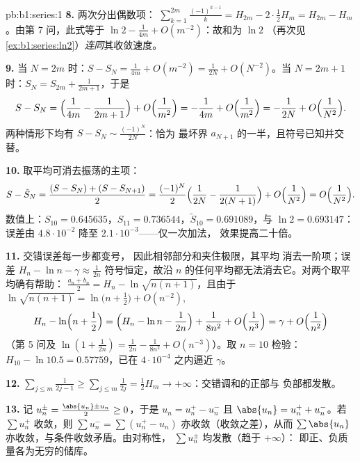 \begin{solution}{pb:b1:series:1}
\textbf{8.} 两次分出偶数项：
$\sum_{k=1}^{2m}\frac{(-1)^{k-1}}{k} = H_{2m} - 2\cdot\frac12
H_m = H_{2m} - H_m$。由第 7 问，此式等于 $\ln 2 -
\frac{1}{4m} + O(m^{-2})$：故和为 $\ln 2$
（再次见\cref{ex:b1:series:ln2}）\emph{连同}其收敛速度。

\textbf{9.} 当 $N = 2m$ 时：$S - S_N = \frac{1}{4m} + O(m^{-2}) =
\frac{1}{2N} + O(N^{-2})$。当 $N = 2m + 1$ 时：$S_{N} = S_{2m} +
\frac{1}{2m+1}$，于是
\[
S - S_N = \Bigl(\frac{1}{4m} - \frac{1}{2m+1}\Bigr) +
O\Bigl(\frac{1}{m^2}\Bigr)
= -\frac{1}{4m} + O\Bigl(\frac{1}{m^2}\Bigr)
= -\frac{1}{2N} + O\Bigl(\frac{1}{N^2}\Bigr).
\]
两种情形下均有 $S - S_N \sim \frac{(-1)^N}{2N}$：恰为
最坏界 $a_{N+1}$ 的一半，且符号已知并交替。

\textbf{10.} 取平均可消去振荡的主项：
\[
S - \tilde S_N = \frac{(S - S_N) + (S - S_{N+1})}{2}
= \frac{(-1)^N}{2}\Bigl(\frac{1}{2N} - \frac{1}{2(N+1)}\Bigr)
+ O\Bigl(\frac{1}{N^2}\Bigr) = O\Bigl(\frac{1}{N^2}\Bigr).
\]
数值上：$S_{10} = 0.645635$，$S_{11} = 0.736544$，$\tilde
S_{10} = 0.691089$，与 $\ln 2 = 0.693147$：误差由
$4.8\cdot10^{-2}$ 降至 $2.1\cdot10^{-3}$——仅一次加法，
效果提高二十倍。

\textbf{11.} 交错误差每一步都变号，
因此相邻部分和夹住极限，其平均
消去一阶项；误差 $H_n - \ln n -
\gamma \approx \frac{1}{2n}$ 符号恒定，故沿
$n$ 的任何平均都无法消去它。对两个\emph{}取平均确有帮助：
$\frac{a_n + b_n}{2} = H_n - \ln\sqrt{n(n+1)}$，且由于
$\ln\sqrt{n(n+1)} = \ln\bigl(n + \frac12\bigr) + O(n^{-2})$,
\[
H_n - \ln\Bigl(n + \frac12\Bigr)
= \Bigl(H_n - \ln n - \frac{1}{2n}\Bigr) + \frac{1}{8n^2} +
O\Bigl(\frac{1}{n^3}\Bigr) = \gamma + O\Bigl(\frac{1}{n^2}\Bigr)
\]
（第 5 问及 $\ln(1 + \frac{1}{2n}) = \frac{1}{2n} -
\frac{1}{8n^2} + O(n^{-3})$）。取 $n = 10$ 检验：$H_{10} -
\ln 10.5 = 0.57759$，已在
$4\cdot10^{-4}$ 之内逼近 $\gamma$。

\textbf{12.} $\sum_{j\leq m} \frac{1}{2j-1} \geq \sum_{j \leq m}
\frac{1}{2j} = \frac12 H_m \to +\infty$：交错调和的正部与
负部都发散。

\textbf{13.} 记 $u_n^\pm = \frac{\abs{u_n} \pm u_n}{2} \geq
0$，于是 $u_n = u_n^+ - u_n^-$ 且 $\abs{u_n} = u_n^+ + u_n^-$。若
$\sum u_n^+$ 收敛，则 $\sum u_n^- = \sum (u_n^+ - u_n)$
亦收敛（收敛之差），从而 $\sum
\abs{u_n}$ 亦收敛，与条件收敛矛盾。由对称性，
$\sum u_n^\pm$ 均发散（趋于 $+\infty$）：
即正、负质量各为无穷的储库。


\end{solution}
